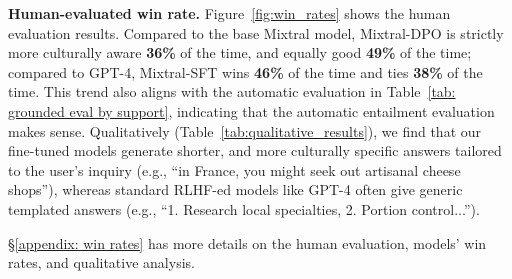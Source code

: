 \documentclass{article} %
\newcommand{\ryan}[1]{\textcolor{magenta}{[#1 --Ryan]}}
\newcommand{\yutong}[1]{\textcolor{orange}{[#1 --Yutong]}}
\begin{document}

\noindent\textbf{Human-evaluated win rate.} Figure~\ref{fig:win_rates} shows the human evaluation results. Compared to the base Mixtral model, Mixtral-DPO is strictly more culturally aware \textbf{36\%} of the time, and equally good \textbf{49\%} of the time; compared to GPT-4, Mixtral-SFT wins \textbf{46\%} of the time and ties \textbf{38\%} of the time. This trend also aligns with the automatic evaluation in Table~\ref{tab: grounded eval by support}, indicating that the automatic entailment evaluation makes sense. Qualitatively (Table~\ref{tab:qualitative_results}), we find that our fine-tuned models generate shorter, and more culturally specific answers tailored to the user's inquiry (e.g., ``in France, you might seek out artisanal cheese shops''), whereas standard RLHF-ed models like GPT-4 often give generic templated answers (e.g., ``1. Research local specialties, 2. Portion control...'').

\S\ref{appendix: win rates} has more details on the human evaluation, models' win rates, and qualitative analysis.
\end{document}
